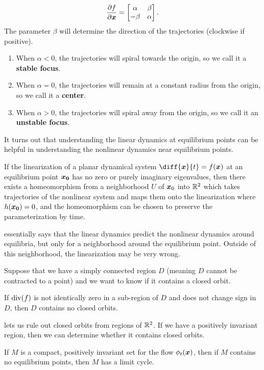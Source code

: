 \begin{enumerate}
\[			\frac{\partial f}{\partial \boldsymbol{x}} = \begin{bmatrix} \alpha & \beta \\ -\beta & \alpha \end{bmatrix}.
		\]
		The parameter $\beta$ will determine the direction of the trajectories
		(clockwise if positive).
		\begin{enumerate}
			\item When $\alpha < 0$, the trajectories will spiral towards the origin,
				so we call it a \textbf{stable focus}.
			\item When $\alpha = 0$, the trajectories will remain at a constant radius
				from the origin, so we call it a \textbf{center}.
			\item When $\alpha > 0$, the trajectories will spiral away from the
				origin, so we call it an \textbf{unstable focus}.
		\end{enumerate}
\end{enumerate}
It turns out that understanding the linear dynamics at equilibrium points can be helpful in
understanding the nonlinear dynamics near equilibrium points.
\begin{theorem}
	If the linearization of a planar dynamical system $\diff{\bs{x}}{t} =
	f(\bs{x})$ at an equilibrium point $\boldsymbol{x_0}$ has no zero or purely imaginary eigenvalues, then there exists a
	homeomorphism from a neighborhood $U$ of $\boldsymbol{x}_0$ into $\mathbb{R}^2$ which takes
	trajectories of the nonlinear system and maps them onto the linearization
	where $h(\boldsymbol{x_0}) = 0$, and the homeomorphism can be chosen to preserve the
	parameterization by time.
	\label{thm:hartman-grobman}
\end{theorem}
 essentially says that the linear dynamics predict the
nonlinear dynamics around equilibria, but only for a neighborhood around the
equilibrium point. Outside of this neighborhood, the linearization may be very
wrong.

Suppose that we have a simply connected region $D$ (meaning $D$ cannot be
contracted to a point) and we want to know if it contains a closed orbit.
\begin{theorem}
	If $\operatorname*{div}(f)$ is not identically zero in a sub-region of $D$ and does not
	change sign in $D$, then $D$ contains no closed orbits.
	\label{thm:bendixons}
\end{theorem}
 lets us rule out closed orbits from regions of
$\mathbb{R}^2$. If we have a positively invariant region, then we can determine whether it
contains closed orbits.
\begin{theorem}
	If $M$ is a compact, positively invariant set for the flow $\phi_t(\boldsymbol{x})$,
	then if $M$ contains no equilibrium points, then $M$ has a limit cycle.
	\label{thm:poincare-bendixson}
\end{theorem}
